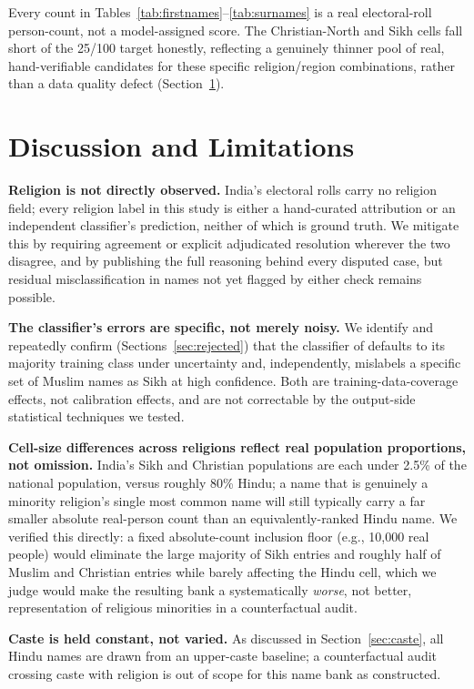 \documentclass[11pt]{article}
\begin{document}
Every count in Tables~\ref{tab:firstnames}--\ref{tab:surnames} is a real electoral-roll person-count, not a model-assigned score. The Christian-North and Sikh cells fall short of the 25/100 target honestly, reflecting a genuinely thinner pool of real, hand-verifiable candidates for these specific religion/region combinations, rather than a data quality defect (Section~\ref{sec:limitations}).

\section{Discussion and Limitations}
\label{sec:limitations}

\textbf{Religion is not directly observed.} India's electoral rolls carry no religion field; every religion label in this study is either a hand-curated attribution or an independent classifier's prediction, neither of which is ground truth. We mitigate this by requiring agreement or explicit adjudicated resolution wherever the two disagree, and by publishing the full reasoning behind every disputed case, but residual misclassification in names not yet flagged by either check remains possible.

\textbf{The classifier's errors are specific, not merely noisy.} We identify and repeatedly confirm (Sections~\ref{sec:rejected}) that the classifier of \citet{chaturvedi2023} defaults to its majority training class under uncertainty and, independently, mislabels a specific set of Muslim names as Sikh at high confidence. Both are training-data-coverage effects, not calibration effects, and are not correctable by the output-side statistical techniques we tested.

\textbf{Cell-size differences across religions reflect real population proportions, not omission.} India's Sikh and Christian populations are each under 2.5\% of the national population, versus roughly 80\% Hindu; a name that is genuinely a minority religion's single most common name will still typically carry a far smaller absolute real-person count than an equivalently-ranked Hindu name. We verified this directly: a fixed absolute-count inclusion floor (e.g., 10,000 real people) would eliminate the large majority of Sikh entries and roughly half of Muslim and Christian entries while barely affecting the Hindu cell, which we judge would make the resulting bank a systematically \emph{worse}, not better, representation of religious minorities in a counterfactual audit.

\textbf{Caste is held constant, not varied.} As discussed in Section~\ref{sec:caste}, all Hindu names are drawn from an upper-caste baseline; a counterfactual audit crossing caste with religion is out of scope for this name bank as constructed.
\end{document}
